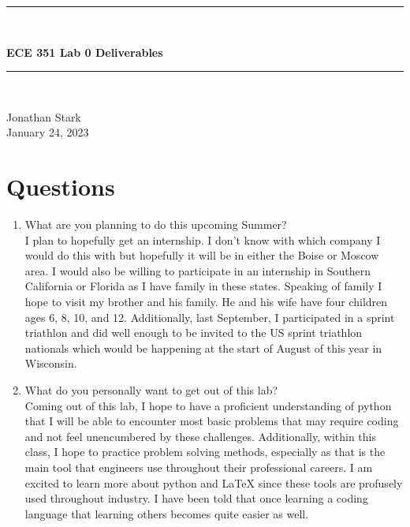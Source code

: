 \documentclass[12pt,a4paper]{article}
\newcommand{\HRule}{\rule{\linewidth}{0.5mm}}
\begin{document}
\begin{center}
    \HRule \\[0.4cm]
    {\LARGE
    \textbf{ECE 351 Lab 0 Deliverables}
    \HRule \\[0.4 cm]}
    {\large 
    Jonathan Stark \\[0.4cm]
    January 24, 2023}
\end{center}
\section{Questions}
\begin{enumerate}
    \item What are you planning to do this upcoming Summer?\\[0.1cm]
    I plan to hopefully get an internship. I don't know with which company I would do this with but hopefully it will be in either the Boise or Moscow area. I would also be willing to participate in an internship in Southern California or Florida as I have family in these states. Speaking of family I hope to visit my brother and his family. He and his wife have four children ages 6, 8, 10, and 12. Additionally, last September, I participated in a sprint triathlon and did well enough to be invited to the US sprint triathlon nationals which would be happening at the start of August of this year in Wisconsin. \\[0.2cm]
    
    \item What do you personally want to get out of this lab?\\[0.1cm]
    Coming out of this lab, I hope to have a proficient understanding of python that I will be able to encounter most basic problems that may require coding and not feel unencumbered by these challenges. Additionally, within this class, I hope to practice problem solving methods, especially as that is the main tool that engineers use throughout their professional careers. I am excited to learn more about python and LaTeX since these tools are profusely used throughout industry. I have been told that once learning a coding language that learning others becomes quite easier as well.
    
\end{enumerate}





\end{document}
